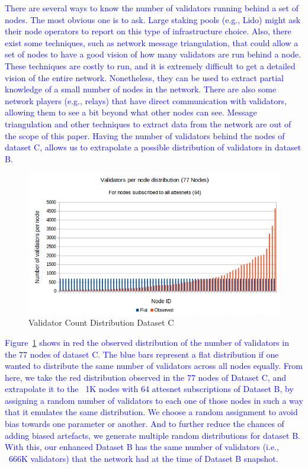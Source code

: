 \documentclass[conference]{IEEEtran}
\newcommand{\leo}[1]{\textcolor{blue}{#1}}
\begin{document}
\leo{There are several ways to know the number of validators running behind a set of nodes. The most obvious one is to ask. Large staking pools (e.g., Lido) might ask their node operators to report on this type of infrastructure choice. Also, there exist some techniques, such as network message triangulation, that could allow a set of nodes to have a good vision of how many validators are run behind a node. These techniques are costly to run, and it is extremely difficult to get a detailed vision of the entire network. Nonetheless, they can be used to extract partial knowledge of a small number of nodes in the network. There are also some network players (e.g., relays) that have direct communication with validators, allowing them to see a bit beyond what other nodes can see. Message triangulation and other techniques to extract data from the network are out of the scope of this paper. Having the number of validators behind the nodes of dataset C, allows us to extrapolate a possible distribution of validators in dataset B.}

\begin{figure}
    \centering
    \includegraphics[width=0.95\linewidth]{figures/dist77.png}
    \caption{Validator Count Distribution Dataset C}
    \label{fig:datac}
\end{figure}

\leo{Figure~\ref{fig:datac} shows in red the observed distribution of the number of validators in the 77 nodes of dataset C. The blue bars represent a flat distribution if one wanted to distribute the same number of validators across all nodes equally. From here, we take the red distribution observed in the 77 nodes of Dataset C, and extrapolate it to the ~1K nodes with 64 attesnet subscriptions of Dataset B, by assigning a random number of validators to each one of those nodes in such a way that it emulates the same distribution. We choose a random assignment to avoid bias towards one parameter or another. And to further reduce the chances of adding biased artefacts, we generate multiple random distributions for dataset B. With this, our enhanced Dataset B has the same number of validators (i.e., ~666K validators) that the network had at the time of Dataset B snapshot.}
\end{document}
